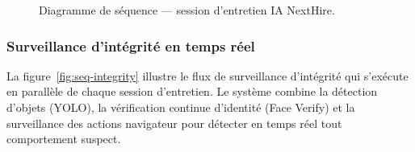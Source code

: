 \begin{figure}[H]
{%
  }
  \caption{Diagramme de séquence --- session d'entretien IA NextHire.}
  \label{fig:seq-interview}
\end{figure}

\subsubsection{Surveillance d'intégrité en temps réel}

La figure~\ref{fig:seq-integrity} illustre le flux de surveillance d'intégrité qui s'exécute
en parallèle de chaque session d'entretien. Le système combine la détection d'objets (YOLO),
la vérification continue d'identité (Face Verify) et la surveillance des actions navigateur
pour détecter en temps réel tout comportement suspect.

